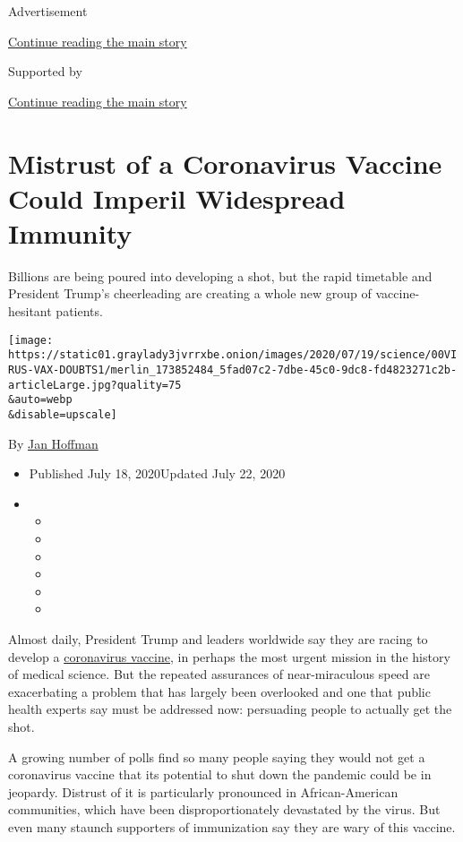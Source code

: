 Advertisement

\protect\hyperlink{after-top}{Continue reading the main story}

Supported by

\protect\hyperlink{after-sponsor}{Continue reading the main story}

\hypertarget{mistrust-of-a-coronavirus-vaccine-could-imperil-widespread-immunity}{%
\section{Mistrust of a Coronavirus Vaccine Could Imperil Widespread
Immunity}\label{mistrust-of-a-coronavirus-vaccine-could-imperil-widespread-immunity}}

Billions are being poured into developing a shot, but the rapid
timetable and President Trump's cheerleading are creating a whole new
group of vaccine-hesitant patients.

\texttt{[image: https://static01.graylady3jvrrxbe.onion/images/2020/07/19/science/00VIRUS-VAX-DOUBTS1/merlin\_173852484\_5fad07c2-7dbe-45c0-9dc8-fd4823271c2b-articleLarge.jpg?quality=75\\\&auto=webp\\\&disable=upscale]}

By \href{https://www.nytimes3xbfgragh.onion/by/jan-hoffman}{Jan Hoffman}

\begin{itemize}
\item
  Published July 18, 2020Updated July 22, 2020
\item
  \begin{itemize}
  \item
  \item
  \item
  \item
  \item
  \item
  \end{itemize}
\end{itemize}

Almost daily, President Trump and leaders worldwide say they are racing
to develop a
\href{https://www.nytimes3xbfgragh.onion/2020/07/22/upshot/vaccine-coronavirus-government-purchase.html}{coronavirus
vaccine}, in perhaps the most urgent mission in the history of medical
science. But the repeated assurances of near-miraculous speed are
exacerbating a problem that has largely been overlooked and one that
public health experts say must be addressed now: persuading people to
actually get the shot.

A growing number of polls find so many people saying they would not get
a coronavirus vaccine that its potential to shut down the pandemic could
be in jeopardy. Distrust of it is particularly pronounced in
African-American communities, which have been disproportionately
devastated by the virus. But even many staunch supporters of
immunization say they are wary of this vaccine.

